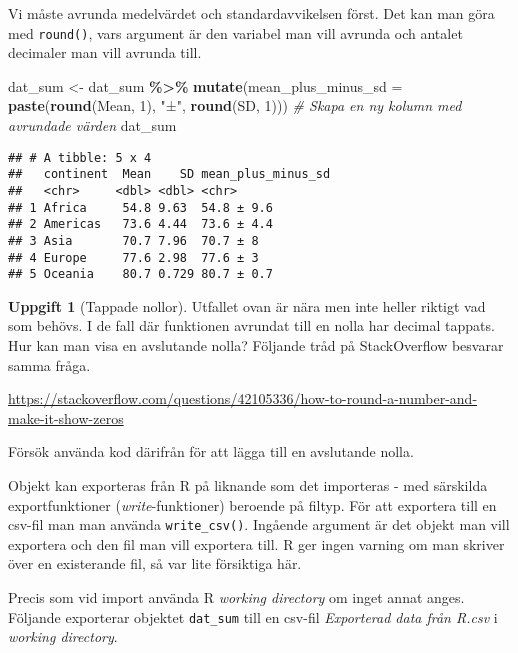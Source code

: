 \documentclass[
]{book}
\newenvironment{Shaded}{\begin{snugshade}}{\end{snugshade}}
\newcommand{\AttributeTok}[1]{\textcolor[rgb]{0.13,0.29,0.53}{#1}}
\newcommand{\CommentTok}[1]{\textcolor[rgb]{0.56,0.35,0.01}{\textit{#1}}}
\newcommand{\DecValTok}[1]{\textcolor[rgb]{0.00,0.00,0.81}{#1}}
\newcommand{\FunctionTok}[1]{\textcolor[rgb]{0.13,0.29,0.53}{\textbf{#1}}}
\newcommand{\NormalTok}[1]{#1}
\newcommand{\OtherTok}[1]{\textcolor[rgb]{0.56,0.35,0.01}{#1}}
\newcommand{\SpecialCharTok}[1]{\textcolor[rgb]{0.81,0.36,0.00}{\textbf{#1}}}
\newcommand{\StringTok}[1]{\textcolor[rgb]{0.31,0.60,0.02}{#1}}
\theoremstyle{definition}
\theoremstyle{definition}
\theoremstyle{definition}
\newtheorem{exercise}{Uppgift}[chapter]
\theoremstyle{definition}
\theoremstyle{remark}
\begin{document}
Vi måste avrunda medelvärdet och standardavvikelsen först. Det kan man göra med \texttt{round()}, vars argument är den variabel man vill avrunda och antalet decimaler man vill avrunda till.

\begin{Shaded}
\begin{Highlighting}[]
\NormalTok{dat\_sum }\OtherTok{\textless{}{-}}\NormalTok{ dat\_sum }\SpecialCharTok{\%\textgreater{}\%} 
  \FunctionTok{mutate}\NormalTok{(}\AttributeTok{mean\_plus\_minus\_sd =} \FunctionTok{paste}\NormalTok{(}\FunctionTok{round}\NormalTok{(Mean, }\DecValTok{1}\NormalTok{), }\StringTok{"±"}\NormalTok{, }\FunctionTok{round}\NormalTok{(SD, }\DecValTok{1}\NormalTok{)))        }\CommentTok{\# Skapa en ny kolumn med avrundade värden}
\NormalTok{dat\_sum}
\end{Highlighting}
\end{Shaded}

\begin{verbatim}
## # A tibble: 5 x 4
##   continent  Mean    SD mean_plus_minus_sd
##   <chr>     <dbl> <dbl> <chr>             
## 1 Africa     54.8 9.63  54.8 ± 9.6        
## 2 Americas   73.6 4.44  73.6 ± 4.4        
## 3 Asia       70.7 7.96  70.7 ± 8          
## 4 Europe     77.6 2.98  77.6 ± 3          
## 5 Oceania    80.7 0.729 80.7 ± 0.7
\end{verbatim}

\begin{exercise}[Tappade nollor]
Utfallet ovan är nära men inte heller riktigt vad som behövs. I de fall där funktionen avrundat till en nolla har decimal tappats. Hur kan man visa en avslutande nolla? Följande tråd på StackOverflow besvarar samma fråga.

\url{https://stackoverflow.com/questions/42105336/how-to-round-a-number-and-make-it-show-zeros}

Försök använda kod därifrån för att lägga till en avslutande nolla.
\end{exercise}

Objekt kan exporteras från R på liknande som det importeras - med särskilda exportfunktioner (\emph{write}-funktioner) beroende på filtyp. För att exportera till en csv-fil man man använda \texttt{write\_csv()}. Ingående argument är det objekt man vill exportera och den fil man vill exportera till. R ger ingen varning om man skriver över en existerande fil, så var lite försiktiga här.

Precis som vid import använda R \emph{working directory} om inget annat anges. Följande exporterar objektet \texttt{dat\_sum} till en csv-fil \emph{Exporterad data från R.csv} i \emph{working directory}.
\end{document}
